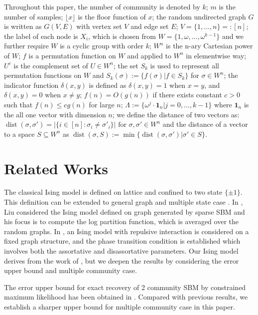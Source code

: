 \documentclass[journal]{IEEEtran}
\newcommand{\1}{\mathbbm{1}}
\DeclareMathOperator{\dist}{dist}
\begin{document}
Throughout this paper, the number of community is denoted by $k$; $m$ is the number of samples; $\lfloor x \rfloor$ is the floor function of $x$; the random undirected graph $G$ is written as $G(V,E)$ with vertex set $V$ and edge set $E$;
$V=\{1,\dots, n\} =: [n]$;
the label of each node is $X_i$, which is chosen from $W= \{1, \omega, \dots, \omega^{k-1}\}$ and we further require $W$
is a cyclic group with order $k$; $W^n$ is the n-ary Cartesian power of $W$;
$f$ is a permutation function on $W$ and applied to $W^n$ in elementwise way;
$U^c$ is the complement set of $U \in W^n$;  
the set $S_k$ is used to represent all permutation functions on $W$ and $S_k(\sigma):=\{f(\sigma)| f\in S_k\}$ for $\sigma \in W^n$;
the indicator function $\delta(x,y)$ is defined as
$\delta(x,y) = 1 $ when $x=y$, and $\delta(x,y)=0$ when $x\neq y$;
$f(n) = O(g(n))$ if there exists constant $c > 0$ such that $ f(n) \leq c g(n)$
for large $n$;
$\Lambda := \{ \omega^j  \cdot \mathbf{1}_n | j=0, \dots,k-1\}$
where $\mathbf{1}_n$ is the all one vector with dimension $n$;
we define the distance of two vectors as:
$\dist(\sigma, \sigma')
=|\{i\in[n]:\sigma_i\neq \sigma'_i\}| \textrm{ for } \sigma,\sigma'\in W^n
$ and the distance of a vector to a space $S\subseteq W^n$
as
$\dist(\sigma,S)
:=\min\{\dist(\sigma, \sigma') | \sigma' \in S\}
$.
\section{Related Works}
The classical Ising model is defined on lattice and confined to two state $\{\pm 1\}$. This definition
can be extended to general graph and multiple state case \cite{potts1952some}. In \cite{liu2017log}, Liu considered
the Ising model defined on graph generated by sparse SBM and his focus is to compute the log partition function,
which is averaged over the random graphs. In \cite{berthet2019exact}, an Ising model with repulsive interaction
is considered on a fixed graph structure, and the phase transition condition is established which involves both the assortative and disassortative
parameters. Our Ising model derives from the work of \cite{ye2020exact}, but we deepen the results by considering the error upper bound and
multiple community case.

The error upper bound for exact recovery of 2 community SBM by constrained maximum likelihood has been obtained in \cite{abbe2015exact}.
Compared with previous results, we establish a sharper upper bound for multiple community case in this paper.
\end{document}

